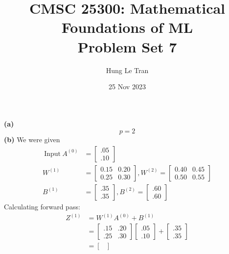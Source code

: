 \documentclass[a4paper, 12pt]{article}
\title{CMSC 25300: Mathematical Foundations of ML \\ \large Problem Set 7}
\date{25 Nov 2023}
\author{Hung Le Tran}
\begin{document}
\maketitle
\setcounter{section}{7}
\begin{problem} [Problem 2]
\end{problem}
\begin{solution}
    \textbf{(a)} \[
        p = 2      
    \]
    \textbf{(b)}
    We were given \begin{align*}
        \:\text{Input}\: A^{(0)} &= \begin{bmatrix}
            .05 \\
            .10
            \end{bmatrix} \\
            W^{(1)} &= \begin{bmatrix}
            0.15 & 0.20 \\
            0.25 & 0.30
            \end{bmatrix}, W^{(2)} = \begin{bmatrix}
            0.40 & 0.45 \\
            0.50 & 0.55
            \end{bmatrix} \\
            B^{(1)} &= \begin{bmatrix}
            .35 \\
            .35
            \end{bmatrix}, B^{(2)} = \begin{bmatrix}
            .60 \\
            .60
            \end{bmatrix}
    \end{align*}
    Calculating forward pass:
    \begin{align*}
        Z^{(1)} &= W^{(1)} A^{(0)} + B^{(1)} \\
        &= \begin{bmatrix}
        .15 & .20 \\
        .25 & .30
        \end{bmatrix} \begin{bmatrix}
        .05\\
        .10
        \end{bmatrix} + \begin{bmatrix}
        .35 \\
        .35
        \end{bmatrix} \\
        &= \begin{bmatrix}

\end{bmatrix}
\end{align*}
\end{solution}
\end{document}
